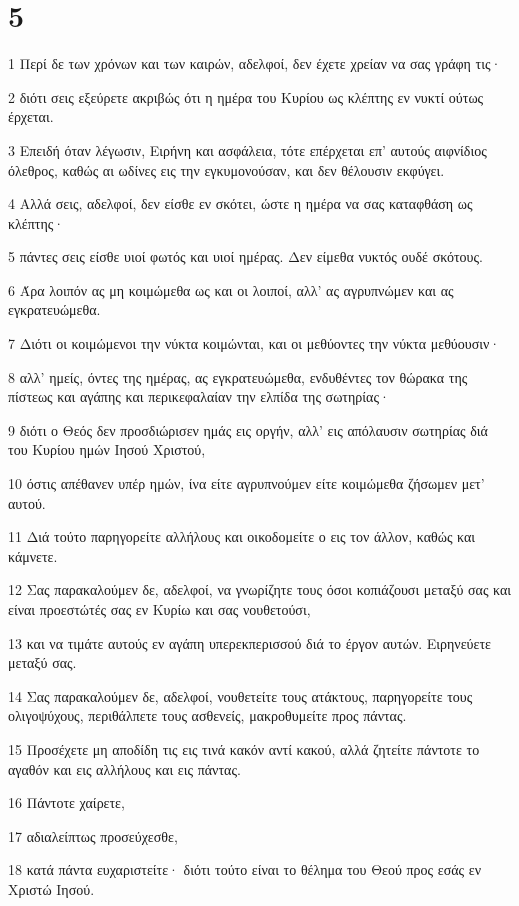 \chapter{5}

\par 1 Περί δε των χρόνων και των καιρών, αδελφοί, δεν έχετε χρείαν να σας γράφη τις·
\par 2 διότι σεις εξεύρετε ακριβώς ότι η ημέρα του Κυρίου ως κλέπτης εν νυκτί ούτως έρχεται.
\par 3 Επειδή όταν λέγωσιν, Ειρήνη και ασφάλεια, τότε επέρχεται επ' αυτούς αιφνίδιος όλεθρος, καθώς αι ωδίνες εις την εγκυμονούσαν, και δεν θέλουσιν εκφύγει.
\par 4 Αλλά σεις, αδελφοί, δεν είσθε εν σκότει, ώστε η ημέρα να σας καταφθάση ως κλέπτης·
\par 5 πάντες σεις είσθε υιοί φωτός και υιοί ημέρας. Δεν είμεθα νυκτός ουδέ σκότους.
\par 6 Άρα λοιπόν ας μη κοιμώμεθα ως και οι λοιποί, αλλ' ας αγρυπνώμεν και ας εγκρατευώμεθα.
\par 7 Διότι οι κοιμώμενοι την νύκτα κοιμώνται, και οι μεθύοντες την νύκτα μεθύουσιν·
\par 8 αλλ' ημείς, όντες της ημέρας, ας εγκρατευώμεθα, ενδυθέντες τον θώρακα της πίστεως και αγάπης και περικεφαλαίαν την ελπίδα της σωτηρίας·
\par 9 διότι ο Θεός δεν προσδιώρισεν ημάς εις οργήν, αλλ' εις απόλαυσιν σωτηρίας διά του Κυρίου ημών Ιησού Χριστού,
\par 10 όστις απέθανεν υπέρ ημών, ίνα είτε αγρυπνούμεν είτε κοιμώμεθα ζήσωμεν μετ' αυτού.
\par 11 Διά τούτο παρηγορείτε αλλήλους και οικοδομείτε ο εις τον άλλον, καθώς και κάμνετε.
\par 12 Σας παρακαλούμεν δε, αδελφοί, να γνωρίζητε τους όσοι κοπιάζουσι μεταξύ σας και είναι προεστώτές σας εν Κυρίω και σας νουθετούσι,
\par 13 και να τιμάτε αυτούς εν αγάπη υπερεκπερισσού διά το έργον αυτών. Ειρηνεύετε μεταξύ σας.
\par 14 Σας παρακαλούμεν δε, αδελφοί, νουθετείτε τους ατάκτους, παρηγορείτε τους ολιγοψύχους, περιθάλπετε τους ασθενείς, μακροθυμείτε προς πάντας.
\par 15 Προσέχετε μη αποδίδη τις εις τινά κακόν αντί κακού, αλλά ζητείτε πάντοτε το αγαθόν και εις αλλήλους και εις πάντας.
\par 16 Πάντοτε χαίρετε,
\par 17 αδιαλείπτως προσεύχεσθε,
\par 18 κατά πάντα ευχαριστείτε· διότι τούτο είναι το θέλημα του Θεού προς εσάς εν Χριστώ Ιησού.
